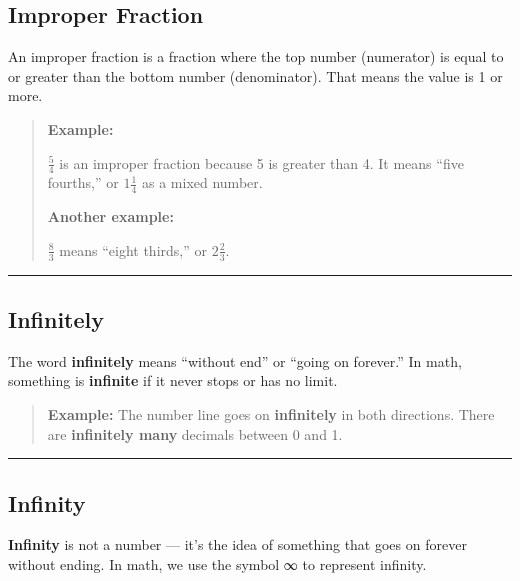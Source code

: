 \documentclass[
  letterpaper,
  DIV=11,
  numbers=noendperiod]{scrreprt}
\begin{document}
\subsection*{Improper Fraction}\label{glossary-improper-fraction}

An improper fraction is a fraction where the top number (numerator) is
equal to or greater than the bottom number (denominator). That means the
value is 1 or more.

\begin{quote}
\textbf{Example:}

\(\frac{5}{4}\) is an improper fraction because 5 is greater than 4. It
means ``five fourths,'' or \(1\frac{1}{4}\) as a mixed number.

\textbf{Another example:}

\(\frac{8}{3}\) means ``eight thirds,'' or \(2\frac{2}{3}\).
\end{quote}

\begin{center}\rule{0.5\linewidth}{0.5pt}\end{center}

\subsection*{Infinitely}\label{glossary-infinitely}

The word \textbf{infinitely} means ``without end'' or ``going on
forever.'' In math, something is \textbf{infinite} if it never stops or
has no limit.

\begin{quote}
\textbf{Example:} The number line goes on \textbf{infinitely} in both
directions. There are \textbf{infinitely many} decimals between 0 and 1.
\end{quote}

\begin{center}\rule{0.5\linewidth}{0.5pt}\end{center}

\subsection*{Infinity}\label{glossary-infinity}

\textbf{Infinity} is not a number --- it's the idea of something that
goes on forever without ending. In math, we use the symbol ∞ to
represent infinity.
\end{document}
